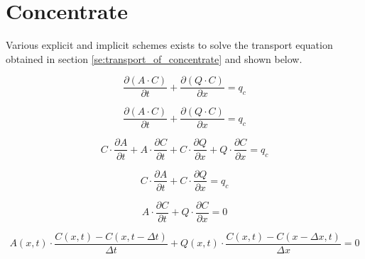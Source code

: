 \section{Concentrate}\label{sec:concentrate}

Various explicit and implicit schemes exists to solve the transport equation obtained in section \ref{se:transport_of_concentrate} and shown below.

\begin{equation}
\frac{\partial (A\cdot C)}{\partial t} + \frac{\partial (Q \cdot C)}{\partial x} = q_c 
\label{eq:transport_sim}
\end{equation}




\begin{equation}
	\frac{\partial (A\cdot C)}{\partial t}+ \frac{\partial (Q \cdot C)}{\partial x} = q_c
\end{equation}

\begin{equation}
	C \cdot \frac{\partial A}{\partial t} + A \cdot \frac{\partial C}{\partial t} + C \cdot \frac{\partial Q}{\partial x} + Q \cdot \frac{\partial C}{\partial x} = q_c
\end{equation}

\begin{equation}
	C \cdot \frac{\partial A}{\partial t} + C \cdot \frac{\partial Q}{\partial x} = q_c
\end{equation}


\begin{equation}
	A \cdot \frac{\partial C}{\partial t} + Q \cdot \frac{\partial C}{\partial x} = 0
\end{equation}


\begin{equation}
	A(x,t) \cdot \frac{C(x,t) - C(x,t-\Delta t)}{\Delta t} + Q(x,t) \cdot \frac{C(x,t)-C(x-\Delta x,t)}{\Delta x} = 0
\end{equation}


